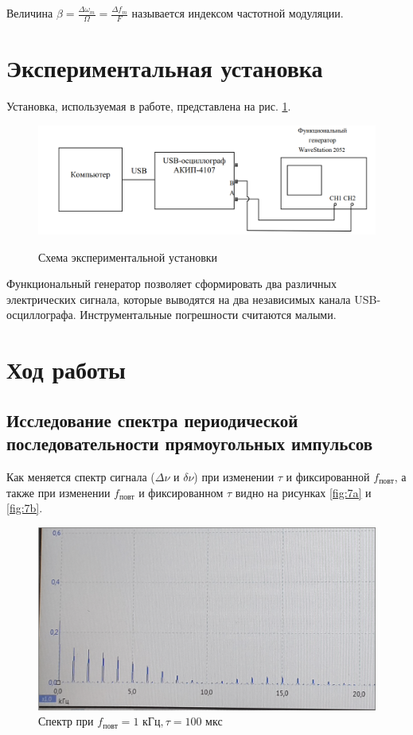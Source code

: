 \documentclass[12pt,a4paper]{article}
\begin{document}
Величина $\beta = \frac{\Delta \omega_m}{\Omega} = \frac{\Delta f_m}{F}$ называется индексом частотной модуляции.


\section*{Экспериментальная установка}

Установка, используемая в работе, представлена на рис. \ref{fig:scheme}.

\begin{figure}[h]
	\centering
	\caption{Схема экспериментальной установки}
	\includegraphics[width=1\linewidth]{res/scheme}
	\label{fig:scheme}
\end{figure}

Функциональный генератор позволяет сформировать два различных электрических сигнала, которые выводятся на два независимых канала USB-осциллографа.
Инструментальные погрешности считаются малыми.










\section*{Ход работы}

\subsection*{Исследование спектра периодической последовательности
прямоугольных импульсов}

Как меняется спектр сигнала ($\Delta \nu$ и $\delta \nu$) при изменении $\tau$ и фиксированной $f_\text{повт}$, а также при изменении $f_\text{повт}$ и фиксированном $\tau$ видно на рисунках \ref{fig:7a} и \ref{fig:7b}.

\begin{figure}[H]
	\centering
	\includegraphics[width = 7 cm]{src/7_0.png}
	\caption{Спектр при $f_\text{повт} = 1 \text{ кГц}, \tau = 100 \text{ мкс}$}
\end{figure}
\end{document}
